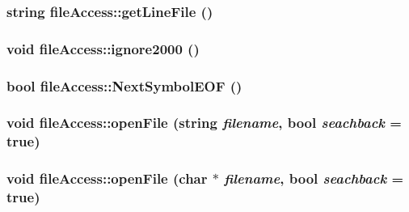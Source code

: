 \label{classfile_access_a39b158208424b8cfb167bc93ce30a351}
\hypertarget{classfile_access_a0fdde34d2a4dac424a6dfbfb95e84102}{
\subsubsection[{getLineFile}]{\setlength{\rightskip}{0pt plus 5cm}string fileAccess::getLineFile ()}}
\label{classfile_access_a0fdde34d2a4dac424a6dfbfb95e84102}
\hypertarget{classfile_access_a675e52ed0c98bb270f00e40ee9fad953}{
\subsubsection[{ignore2000}]{\setlength{\rightskip}{0pt plus 5cm}void fileAccess::ignore2000 ()}}
\label{classfile_access_a675e52ed0c98bb270f00e40ee9fad953}
\hypertarget{classfile_access_a36f6e5fca88b48c20ce2d1839dc51589}{
\subsubsection[{NextSymbolEOF}]{\setlength{\rightskip}{0pt plus 5cm}bool fileAccess::NextSymbolEOF ()}}
\label{classfile_access_a36f6e5fca88b48c20ce2d1839dc51589}
\hypertarget{classfile_access_a943643352e709aec761f13b1705651d4}{
\subsubsection[{openFile}]{\setlength{\rightskip}{0pt plus 5cm}void fileAccess::openFile (string {\em filename}, \/  bool {\em seachback} = {\ttfamily true})}}
\label{classfile_access_a943643352e709aec761f13b1705651d4}
\hypertarget{classfile_access_a9ae5080911deee1e5835f32cabf1f995}{
\subsubsection[{openFile}]{\setlength{\rightskip}{0pt plus 5cm}void fileAccess::openFile (char $\ast$ {\em filename}, \/  bool {\em seachback} = {\ttfamily true})}}
